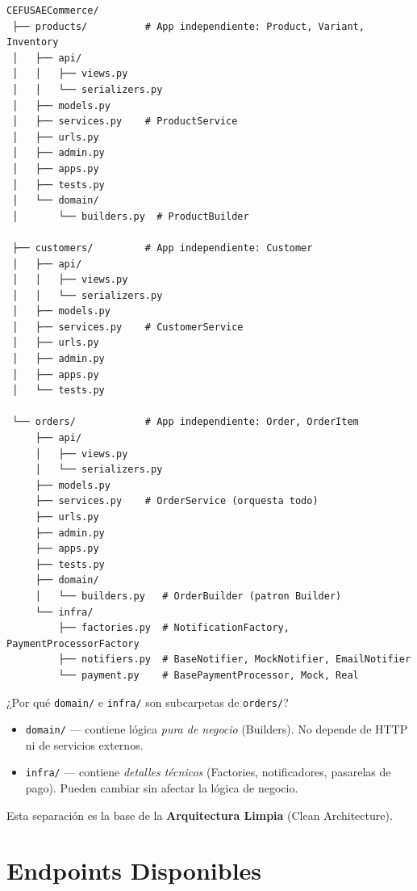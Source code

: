 \documentclass[12pt, a4paper]{article}
\begin{document}
\begin{verbatim}
CEFUSAECommerce/
 ├── products/          # App independiente: Product, Variant, Inventory
 │   ├── api/
 │   │   ├── views.py
 │   │   └── serializers.py
 │   ├── models.py
 │   ├── services.py    # ProductService
 │   ├── urls.py
 │   ├── admin.py
 │   ├── apps.py
 │   ├── tests.py
 │   └── domain/
 │       └── builders.py  # ProductBuilder
 
 ├── customers/         # App independiente: Customer
 │   ├── api/
 │   │   ├── views.py
 │   │   └── serializers.py
 │   ├── models.py
 │   ├── services.py    # CustomerService
 │   ├── urls.py
 │   ├── admin.py
 │   ├── apps.py
 │   └── tests.py
 
 └── orders/            # App independiente: Order, OrderItem
     ├── api/
     │   ├── views.py
     │   └── serializers.py
     ├── models.py
     ├── services.py    # OrderService (orquesta todo)
     ├── urls.py
     ├── admin.py
     ├── apps.py
     ├── tests.py
     ├── domain/
     │   └── builders.py   # OrderBuilder (patron Builder)
     └── infra/
         ├── factories.py  # NotificationFactory, PaymentProcessorFactory
         ├── notifiers.py  # BaseNotifier, MockNotifier, EmailNotifier
         └── payment.py    # BasePaymentProcessor, Mock, Real
\end{verbatim}

\begin{tipbox}{¿Por qué \texttt{domain/} e \texttt{infra/} son subcarpetas de \texttt{orders/}?}
\begin{itemize}[noitemsep]
  \item \texttt{domain/} — contiene lógica \textit{pura de negocio} (Builders). No depende de HTTP ni de servicios externos.
  \item \texttt{infra/} — contiene \textit{detalles técnicos} (Factories, notificadores, pasarelas de pago). Pueden cambiar sin afectar la lógica de negocio.
\end{itemize}
Esta separación es la base de la \textbf{Arquitectura Limpia} (Clean Architecture).
\end{tipbox}

\section{Endpoints Disponibles}
\end{document}
